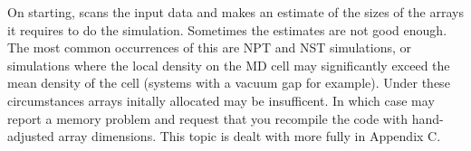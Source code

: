On starting, \D{} scans the input data and makes an estimate of the
sizes of the arrays it requires to do the simulation. Sometimes the
estimates are not good enough. The most common occurrences of this are
NPT and NST simulations, or simulations where the local density on the
MD cell may significantly exceed the mean density of the cell (systems
with a vacuum gap for example). Under these circumstances arrays
initally allocated may be insufficent. In which case \D{} may report a
memory problem and request that you recompile the code with
hand-adjusted array dimensions. This topic is dealt with more fully in
Appendix C.

